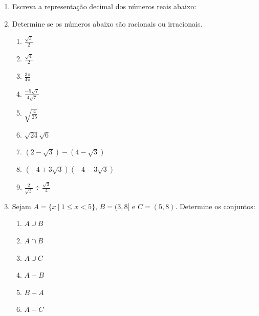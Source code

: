 \documentclass[a4paper,5pt]{amsbook}
\newcommand{\ds}{\displaystyle}
\begin{document}
\vspace{1cm}
\begin{enumerate}
    \setlength\itemsep{0.5cm}
    \item Escreva a representa\c{c}\~ao decimal dos n\'umeros reais abaixo:

        \noindent{}

    \item Determine se os n\'umeros abaixo s\~ao racionais ou irracionais.
        \begin{enumerate}
            \setlength\itemsep{0.2cm}
            \item $\ds\frac{\sqrt{3}}{2}$
            \item $\ds\frac{\sqrt{4}}{2}$
            \item $\ds\frac{3\pi}{4\pi}$
            \item $\ds\frac{-5\sqrt{7}}{4\sqrt{7}}$
            \item $\ds\sqrt{\frac{4}{25}}$
            \item $\sqrt{24}\sqrt{6}$
            \item $(2-\sqrt{3})-(4-\sqrt{3})$
            \item $(-4+3\sqrt{3})(-4-3\sqrt{3})$
            \item $\ds\frac{2}{\sqrt{3}}\div\frac{\sqrt{3}}{4}$
        \end{enumerate}

    \item Sejam $A=\{x\ |\ 1\le x < 5\}$, $B=(3,8]$ e $C=(5,8)$.  Determine os
    conjuntos:
        \begin{enumerate}
            \setlength\itemsep{0.2cm}
            \item $A\cup B$
            \item $A\cap B$
            \item $A\cup C$
            \item $A-B$
            \item $B-A$
            \item $A-C$
        \end{enumerate}
\end{enumerate}
\end{document}

